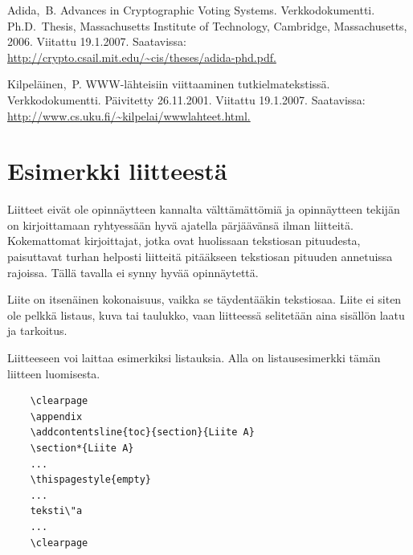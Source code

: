 \documentclass[english, 12pt, a4paper, elec, utf8, a-1b, online]{aaltothesis}
\begin{document}
\begin{thebibliography}{99}
 Adida,\ B.  Advances in Cryptographic Voting Systems.
  Verkkodokumentti. Ph.D.\ Thesis, Massachusetts Institute of
  Technology, Cambridge, 
  \foreignlanguage{english}{Massachusetts,}
  2006. Viitattu 19.1.2007.  Saatavissa:
  \url{http://crypto.csail.mit.edu/~cis/theses/adida-phd.pdf.}

 Kilpel\"ainen,\ P. WWW-l\"ahteisiin viittaaminen
  tutkielmatekstiss\"a. Verkkodokumentti. P\"aivitetty 26.11.2001.
  Viitattu 19.1.2007. Saatavissa:
  \url{http://www.cs.uku.fi/~kilpelai/wwwlahteet.html.}

\end{thebibliography}

\clearpage

\thesisappendix

\section{Esimerkki liitteest\"a\label{LiiteA}}

Liitteet eiv\"at ole opinn\"aytteen kannalta v\"altt\"am\"att\"omi\"a ja 
opinn\"aytteen tekij\"an on 
kirjoittamaan ryhtyess\"a\"an hyv\"a ajatella p\"arj\"a\"av\"ans\"a ilman liitteit\"a.
Kokemattomat kirjoittajat, jotka ovat huolissaan
tekstiosan pituudesta, paisuttavat turhan 
helposti liitteit\"a pit\"a\"akseen tekstiosan pituuden annetuissa rajoissa.
T\"all\"a tavalla ei synny hyv\"a\"a opinn\"aytett\"a.   

Liite on itsen\"ainen kokonaisuus, vaikka se t\"aydent\"a\"akin tekstiosaa.
Liite ei siten ole pelkk\"a listaus, kuva tai taulukko, vaan 
liitteess\"a selitet\"a\"an aina sis\"all\"on laatu ja tarkoitus. 

Liitteeseen voi laittaa esimerkiksi listauksia. Alla on 
listausesimerkki t\"am\"an liitteen luomisesta. 

\begin{verbatim}
	\clearpage
	\appendix
	\addcontentsline{toc}{section}{Liite A}
	\section*{Liite A}
	...
	\thispagestyle{empty}
	...
	teksti\"a
	...
	\clearpage
\end{verbatim}
\end{document}
